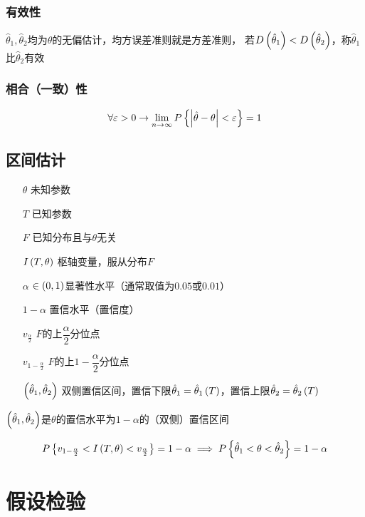 \documentclass{article}
\begin{document}
\subsubsection{有效性}

$\hat\theta_1,\hat\theta_2$均为$\theta$的无偏估计，均方误差准则就是方差准则，
若$D\left(\hat\theta_1\right)<D\left(\hat\theta_2\right)$，称$\hat\theta_1$比$\hat\theta_2$有效

\subsubsection{相合（一致）性}

\[\forall\varepsilon>0\to\lim\limits_{n\to\infty}P\left\{\left|\hat\theta-\theta\right|<\varepsilon\right\}=1\]

\subsection{区间估计}

\begin{enumerate}
    \item [$\theta$] 未知参数
    \item [$T$] 已知参数
    \item [$F$] 已知分布且与$\theta$无关
    \item [$I\left(T,\theta\right)$] 枢轴变量，服从分布$F$
    \item [$\alpha$] $\in\left(0,1\right)$显著性水平（通常取值为$0.05$或$0.01$）
    \item [$1-\alpha$] 置信水平（置信度）
    \item [$v_\frac\alpha2$] $F$的上$\dfrac\alpha2$分位点
    \item [$v_{1-\frac\alpha2}$] $F$的上$1-\dfrac\alpha2$分位点
    \item [$\left(\hat\theta_1,\hat\theta_2\right)$] 双侧置信区间，置信下限$\hat\theta_1=\hat\theta_1\left(T\right)$，置信上限$\hat\theta_2=\hat\theta_2\left(T\right)$
\end{enumerate}

$\left(\hat\theta_1,\hat\theta_2\right)$是$\theta$的置信水平为$1-\alpha$的（双侧）置信区间

\[P\left\{v_{1-\frac\alpha2}<I\left(T,\theta\right)<v_\frac\alpha2\right\}=1-\alpha\implies P\left\{\hat\theta_1<\theta<\hat\theta_2\right\}=1-\alpha\]

\section{假设检验}
\end{document}
